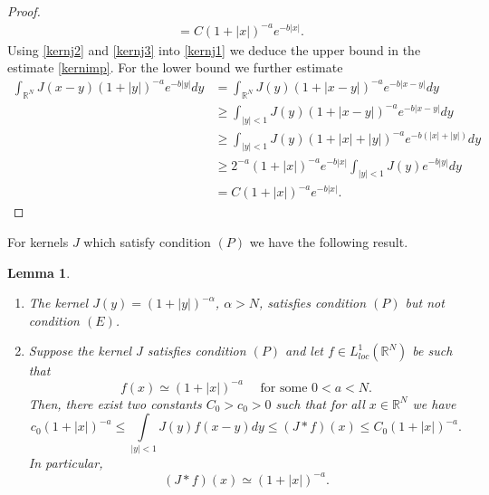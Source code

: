\documentclass[leqno,12pt]{article}
\newcommand{\intl}{\int\limits}
\newcommand{\R}{\mathbb R}
\newtheorem{lemma}[theorem]{Lemma}
\numberwithin{equation}{section}
\begin{document}
\begin{proof}
\begin{equation}
\begin{aligned}
&=C (1+|x|)^{-a}e^{-b |x|}.
\end{aligned}
\end{equation}
Using \eqref{kernj2} and \eqref{kernj3} into \eqref{kernj1} we deduce the upper bound in the estimate \eqref{kernimp}. For the lower bound we further estimate
$$
\begin{aligned}
\int_{\R^N} J(x-y) (1+|y|)^{-a}e^{-b|y|} dy & = \int_{\R^N} J(y) (1+|x-y|)^{-a}e^{-b |x-y|} dy \\
&\geq \int_{|y|<1} J(y)(1+|x-y|)^{-a}e^{-b|x-y|}dy\\
& \geq \int_{|y|<1} J(y) (1+|x|+|y|)^{-a}e^{-b(|x|+|y|)} dy \\
& \geq 2^{-a} (1+|x|)^{-a}e^{-b |x|} \int_{|y|<1} J(y)e^{-b|y|}  dy\\
&= C (1+|x|)^{-a}e^{-b |x|}.
\end{aligned}
$$
\end{proof}
For kernels $J$ which satisfy condition $(P)$ we have the following result. 
\begin{lemma}\label{l12}
\begin{enumerate}
\item[\rm (i)] The kernel $J(y)=(1+|y|)^{-\alpha}$, $\alpha>N$, satisfies condition $(P)$ but not condition $(E)$.
\item[\rm (ii)] Suppose the kernel $J$ satisfies condition $(P)$ and let $f\in L^1_{loc}(\R^N)$ be such that 
$$
f(x)\simeq (1+|x|)^{-a} \quad\mbox{ for some }0<a<N.
$$
Then, there exist two constants $C_0>c_0>0$ such that for all $x\in \R^N$ we have 
\begin{equation}\label{kernimp2}
c_0 (1+|x|)^{-a}\leq \intl_{|y|<1} J(y) f(x-y) dy\leq (J*f)(x)\leq C_0 (1+|x|)^{-a}.
\end{equation}
In particular,
\begin{equation}\label{kernj2a}
(J * f)(x) \simeq (1+|x|)^{-a}.
\end{equation}
\end{enumerate}
\end{lemma}
\end{document}
